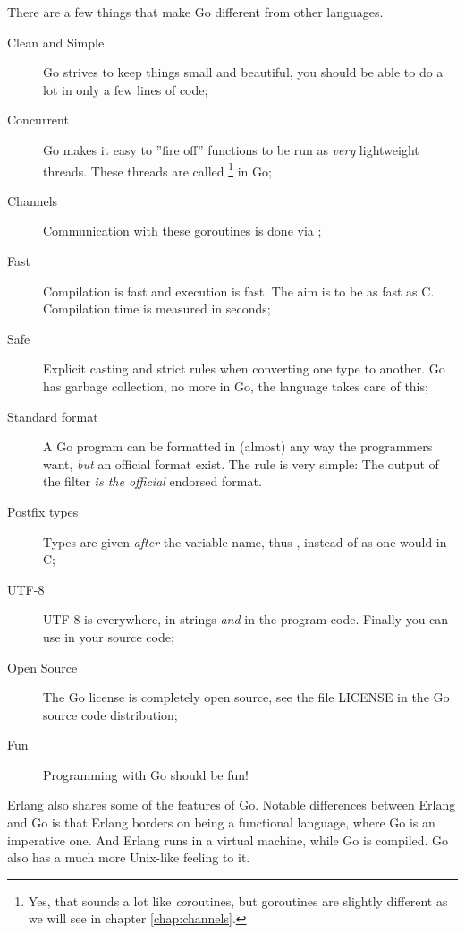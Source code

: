 \noindent{}There are a few things that make Go different from other
languages.
\begin{description}
\item[Clean and Simple]
Go strives to keep things small and beautiful, you should
be able to do a lot in only a few lines of code;
\item[Concurrent]
Go makes it easy to ''fire off'' functions to be
run as \emph{very} lightweight threads. These threads are called
 \footnote{Yes, that sounds a lot like
\emph{co}routines, but goroutines are slightly different as we will
see in chapter \ref{chap:channels}.} in Go;
\item[Channels] 
Communication with these goroutines is done
via  \cite{csp, hoare};

\item[Fast]
Compilation is fast and execution is fast. The aim is
to be as fast as C. Compilation time is measured in seconds;

\item[Safe]
Explicit casting and strict rules when converting one type to another.
Go has garbage collection, no more  in Go, the language takes care of this;

\item[Standard format]
A Go program can be formatted in (almost) any way the programmers want,
\emph{but} an official format exist. The rule is very simple:
The output of the filter  \emph{is the official} endorsed
format.

\item[Postfix types]
Types are given \emph{after} the variable name, thus ,
instead of  as one would in C;

\item[UTF-8]
UTF-8 is everywhere, in strings
\emph{and} in the program code. Finally you can use  in your source code;

\item[Open Source]
The Go license is completely open source, see the file LICENSE in the Go
source code distribution;

\item[Fun]
Programming with Go should be fun!

\end{description}
Erlang \cite{erlang} also shares some
of the features of Go. Notable differences between Erlang
and Go is that Erlang borders on being a functional language,
where Go is an imperative one. And Erlang runs in a virtual
machine, while Go is compiled. Go also has a much more Unix-like
feeling to it.

